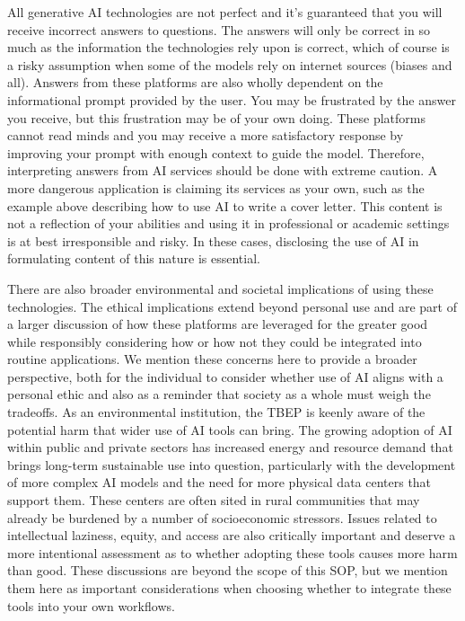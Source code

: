 \documentclass[
]{book}
\begin{document}
All generative AI technologies are not perfect and it's guaranteed that you will receive incorrect answers to questions. The answers will only be correct in so much as the information the technologies rely upon is correct, which of course is a risky assumption when some of the models rely on internet sources (biases and all). Answers from these platforms are also wholly dependent on the informational prompt provided by the user. You may be frustrated by the answer you receive, but this frustration may be of your own doing. These platforms cannot read minds and you may receive a more satisfactory response by improving your prompt with enough context to guide the model. Therefore, interpreting answers from AI services should be done with extreme caution. A more dangerous application is claiming its services as your own, such as the example above describing how to use AI to write a cover letter. This content is not a reflection of your abilities and using it in professional or academic settings is at best irresponsible and risky. In these cases, disclosing the use of AI in formulating content of this nature is essential.

There are also broader environmental and societal implications of using these technologies. The ethical implications extend beyond personal use and are part of a larger discussion of how these platforms are leveraged for the greater good while responsibly considering how or how not they could be integrated into routine applications. We mention these concerns here to provide a broader perspective, both for the individual to consider whether use of AI aligns with a personal ethic and also as a reminder that society as a whole must weigh the tradeoffs. As an environmental institution, the TBEP is keenly aware of the potential harm that wider use of AI tools can bring. The growing adoption of AI within public and private sectors has increased energy and resource demand that brings long-term sustainable use into question, particularly with the development of more complex AI models and the need for more physical data centers that support them. These centers are often sited in rural communities that may already be burdened by a number of socioeconomic stressors. Issues related to intellectual laziness, equity, and access are also critically important and deserve a more intentional assessment as to whether adopting these tools causes more harm than good. These discussions are beyond the scope of this SOP, but we mention them here as important considerations when choosing whether to integrate these tools into your own workflows.
\end{document}
